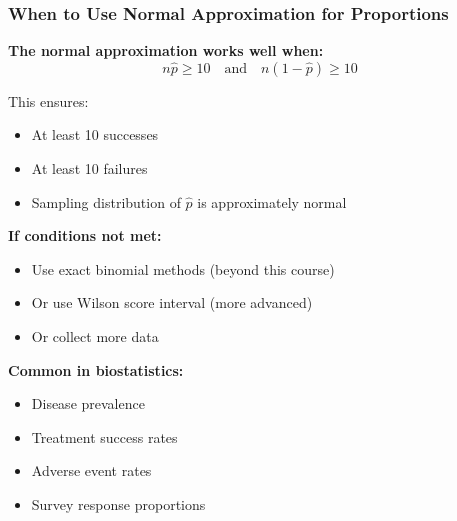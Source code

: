\documentclass{beamer}
\begin{document}
\begin{frame}
\frametitle{When to Use Normal Approximation for Proportions}
\textbf{The normal approximation works well when:}
$$n\hat{p} \geq 10 \quad \text{and} \quad n(1-\hat{p}) \geq 10$$

\vspace{0.3cm}
This ensures:
\begin{itemize}
\item At least 10 successes
\item At least 10 failures
\item Sampling distribution of $\hat{p}$ is approximately normal
\end{itemize}

\vspace{0.5cm}
\textbf{If conditions not met:}
\begin{itemize}
\item Use exact binomial methods (beyond this course)
\item Or use Wilson score interval (more advanced)
\item Or collect more data
\end{itemize}

\vspace{0.5cm}
\textbf{Common in biostatistics:}
\begin{itemize}
\item Disease prevalence
\item Treatment success rates
\item Adverse event rates
\item Survey response proportions
\end{itemize}
\end{frame}
\end{document}
